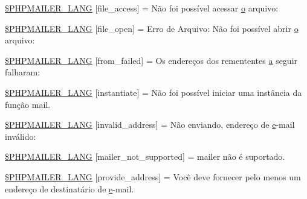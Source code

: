 \begin{DoxyCompactItemize}
\item 
\hyperlink{phpmailer_8lang-br_8php_a7e83349023b856ef9e5c46e30ae6d51e}{\$\+P\+H\+P\+M\+A\+I\+L\+E\+R\+\_\+\+L\+A\+NG} \mbox{[}\textquotesingle{}file\+\_\+access\textquotesingle{}\mbox{]} = \textquotesingle{}Não foi possível acessar \hyperlink{fullpage_2plugin_8min_8js_a4afc7c854f61c136d7bcfa8997651b88}{o} arquivo\+: \textquotesingle{}
\item 
\hyperlink{phpmailer_8lang-br_8php_a28d1a6517bf4c942a0ddd506188ad2e0}{\$\+P\+H\+P\+M\+A\+I\+L\+E\+R\+\_\+\+L\+A\+NG} \mbox{[}\textquotesingle{}file\+\_\+open\textquotesingle{}\mbox{]} = \textquotesingle{}Erro de Arquivo\+: Não foi possível abrir \hyperlink{fullpage_2plugin_8min_8js_a4afc7c854f61c136d7bcfa8997651b88}{o} arquivo\+: \textquotesingle{}
\item 
\hyperlink{phpmailer_8lang-br_8php_adf832ae12155a09be077c6d5e4fd7e22}{\$\+P\+H\+P\+M\+A\+I\+L\+E\+R\+\_\+\+L\+A\+NG} \mbox{[}\textquotesingle{}from\+\_\+failed\textquotesingle{}\mbox{]} = \textquotesingle{}Os endereços dos remententes \hyperlink{_chart_8min_8js_aef3b685c08bc6c76c8e729bd0e93901d}{a} seguir falharam\+: \textquotesingle{}
\item 
\hyperlink{phpmailer_8lang-br_8php_ad58dde16780f4770ccf4dd282ea1f5ad}{\$\+P\+H\+P\+M\+A\+I\+L\+E\+R\+\_\+\+L\+A\+NG} \mbox{[}\textquotesingle{}instantiate\textquotesingle{}\mbox{]} = \textquotesingle{}Não foi possível iniciar uma instância da função mail.\textquotesingle{}
\item 
\hyperlink{phpmailer_8lang-br_8php_a42d61bcea4c79599ecb44fd062f54d47}{\$\+P\+H\+P\+M\+A\+I\+L\+E\+R\+\_\+\+L\+A\+NG} \mbox{[}\textquotesingle{}invalid\+\_\+address\textquotesingle{}\mbox{]} = \textquotesingle{}Não enviando, endereço de \hyperlink{jquery-ui_8min_8js_abea95a4e94bc6f4151d5683d4c12c3f4}{e}-\/mail inválido\+: \textquotesingle{}
\item 
\hyperlink{phpmailer_8lang-br_8php_aa2ebcb8833ee83a7ad67401c4bb3a6ad}{\$\+P\+H\+P\+M\+A\+I\+L\+E\+R\+\_\+\+L\+A\+NG} \mbox{[}\textquotesingle{}mailer\+\_\+not\+\_\+supported\textquotesingle{}\mbox{]} = \textquotesingle{} mailer não é suportado.\textquotesingle{}
\item 
\hyperlink{phpmailer_8lang-br_8php_a8b97897c2406b7392b056f375feeefbb}{\$\+P\+H\+P\+M\+A\+I\+L\+E\+R\+\_\+\+L\+A\+NG} \mbox{[}\textquotesingle{}provide\+\_\+address\textquotesingle{}\mbox{]} = \textquotesingle{}Você deve fornecer pelo menos um endereço de destinatário de \hyperlink{jquery-ui_8min_8js_abea95a4e94bc6f4151d5683d4c12c3f4}{e}-\/mail.\textquotesingle{}
\item 

\end{DoxyCompactItemize}
